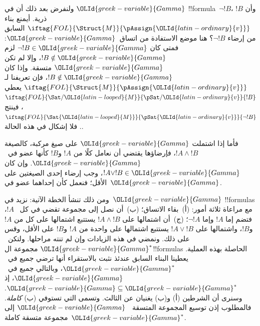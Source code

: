 \documentclass[../../../include/open-logic-section]{subfiles}
\begin{document}
ولنفرض بعد ذلك أن في $\OLId{greek-variable}{Gamma}$ !!{formula}~$\lnot !B$، وأن $!B$
ذرية. أيمنع بناء $\iftag{FOL}{\Struct{M}}{\pAssign{\OLId{latin-ordinary}{v}}}$ السابق من
إرضاء $\lnot !B$؟ هنا موضع الاستفادة من اتساق~$\OLId{greek-variable}{Gamma}$: فمتى كان
$\lnot !B \in \OLId{greek-variable}{Gamma}$ لزم $!B \notin \OLId{greek-variable}{Gamma}$، وإلا لم تكن $\OLId{greek-variable}{Gamma}$
متسقة. وإذا كان $!B \notin \OLId{greek-variable}{Gamma}$، فإن تعريفنا لـ
$\iftag{FOL}{\Struct{M}}{\pAssign{\OLId{latin-ordinary}{v}}}$ يعطي
$\iftag{FOL}{\Sat/{\OLId{latin-looped}{M}}}{\pSat/{\OLId{latin-ordinary}{v}}}{!B}$، فينتج
$\iftag{FOL}{\Sat{\OLId{latin-looped}{M}}}{\pSat{\OLId{latin-ordinary}{v}}}{\lnot !B}$. فلا إشكال في هذه الحالة.

فأما إذا اشتملت $\OLId{greek-variable}{Gamma}$ على صيغ مركبة، كالصيغة $!A \land !B$،
فإرضاؤها يقتضي أن نعامل كلًا من $!A$ و$!B$ كأنها عضو
في~$\OLId{greek-variable}{Gamma}$. وإن كان $!A \lor !B \in \OLId{greek-variable}{Gamma}$، وجب إرضاء إحدى
الصيغتين على الأقل؛ فنعمل كأن إحداهما عضو في~$\OLId{greek-variable}{Gamma}$.

ومن ذلك تنشأ الخطة الآتية: نزيد في~$\OLId{greek-variable}{Gamma}$ !!{formula}s مع مراعاة
ثلاثة أمور: (أ)~بقاء الاتساق؛ (ب)~أن نصل إلى مجموعة تقضي في كل
~$!A$، فتضم إما $!A$ وإما
$\lnot !A$؛ (ج)~أن اشتمالها على $!A \land !B$ يستتبع اشتمالها على
كل من $!A$ و$!B$، واشتمالها على $!A \lor !B$ يستتبع اشتمالها على
واحدة من $!A$ و$!B$ على الأقل، وقس على ذلك. ونمضي في هذه الزيادات
وإن لم تنته مراحلها. ولتكن~$\OLId{greek-variable}{Gamma}^*$ مجموعة ال!!{formula}s الحاصلة
بهذه العملية. يعطينا البناء السابق عندئذ
نثبت بالاستقراء أنها ترضي جميع
 في~$\OLId{greek-variable}{Gamma}^*$، وبالتالي
جميع  في~$\OLId{greek-variable}{Gamma}$، إذ
$\OLId{greek-variable}{Gamma} \subseteq \OLId{greek-variable}{Gamma}^*$. وسنرى أن الشرطين (أ) و(ب) يغنيان عن
الثالث. وتسمى 
التي تستوفي (ب) \emph{كاملة}. فالمطلوب إذن توسيع المجموعة المتسقة
~$\OLId{greek-variable}{Gamma}$ إلى مجموعة متسقة كاملة~$\OLId{greek-variable}{Gamma}^*$.
\end{document}
